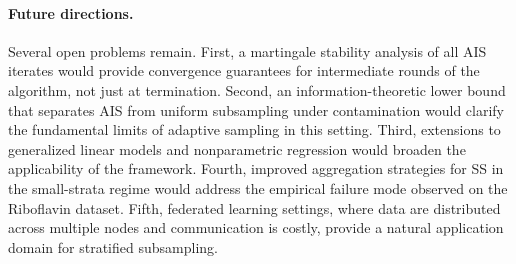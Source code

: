 \documentclass[10pt]{article}
\begin{document}
\paragraph{Future directions.}
Several open problems remain.
First, a martingale stability analysis of all AIS iterates would provide
convergence guarantees for intermediate rounds of the algorithm, not just at
termination.
Second, an information-theoretic lower bound that separates AIS from uniform
subsampling under contamination would clarify the fundamental limits of adaptive
sampling in this setting.
Third, extensions to generalized linear models and nonparametric regression would
broaden the applicability of the framework.
Fourth, improved aggregation strategies for SS in the small-strata regime would
address the empirical failure mode observed on the Riboflavin dataset.
Fifth, federated learning settings, where data are distributed across multiple
nodes and communication is costly, provide a natural application domain for
stratified subsampling.



\end{document}
